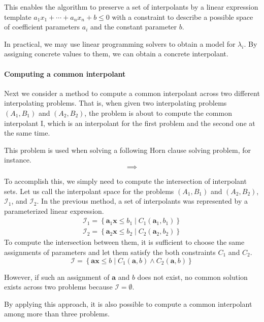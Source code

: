 This enables the algorithm to preserve a set of interpolants by a
linear expression template $a_1 x_1 + \cdots + a_n x_n + b \leq 0$
with a constraint to describe a possible space of coefficient
parameters $a_i$ and the constant parameter $b$.

In practical, we may use linear programming solvers to obtain a model
for $\lambda_i$.  By assigning concrete values to them, we can obtain
a concrete interpolant.


\paragraph{Computing a common interpolant}
Next we consider a method to compute a common interpolant across two
different interpolating problems.  That is, when given two
interpolating problems $\left(A_1, B_1 \right)$ and $\left(A_2, B_2
\right)$, the problem is about to compute the common interpolant I,
which is an interpolant for the first problem and the second one at
the same time.

This problem is used when solving a following Horn clause solving
problem, for instance.
\[
\implies
\]

To accomplish this, we simply need to compute the intersection of
interpolant sets.  Let us call the interpolant space for the problems
$\left(A_1, B_1 \right)$ and $\left(A_2, B_2 \right)$,
$\mathcal{I}_1$, and $\mathcal{I}_2$.  In the previous method, a set
of interpolants was represented by a parameterized linear expression.
\begin{align*}
\mathcal{I}_1 = \left\lbrace \mathbf{a}_1 \mathbf{x} \leq b_1 \mid
C_1 (\mathbf{a}_1, b_1 ) \right\rbrace \\
\mathcal{I}_2 = \left\lbrace \mathbf{a}_2 \mathbf{x} \leq b_2 \mid
C_2 (\mathbf{a}_2, b_2 ) \right\rbrace
\end{align*}
To compute the intersection between them, it is sufficient to choose
the same assignments of parameters and let them satisfy the both
constraints $C_1$ and $C_2$.
\[ \mathcal{I} = \left\lbrace \mathbf{a} \mathbf{x} \leq b \mid
C_1(\mathbf{a}, b) \wedge C_2(\mathbf{a}, b) \right\rbrace \]

However, if such an assignment of $\mathbf{a}$ and $b$ does not exist,
no common solution exists across two problems because $\mathcal{I} =
\emptyset$.

By applying this approach, it is also possible to compute a common
interpolant among more than three problems.


